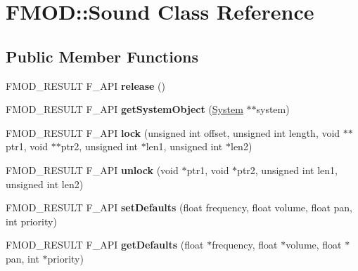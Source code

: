 \hypertarget{class_f_m_o_d_1_1_sound}{}\section{F\+M\+OD\+:\+:Sound Class Reference}
\label{class_f_m_o_d_1_1_sound}
\subsection*{Public Member Functions}
\begin{DoxyCompactItemize}
\item 
F\+M\+O\+D\+\_\+\+R\+E\+S\+U\+LT F\+\_\+\+A\+PI {\bfseries release} ()\hypertarget{class_f_m_o_d_1_1_sound_ab0d8425b6f8ad26b4011dc36fee9948c}{}\label{class_f_m_o_d_1_1_sound_ab0d8425b6f8ad26b4011dc36fee9948c}

\item 
F\+M\+O\+D\+\_\+\+R\+E\+S\+U\+LT F\+\_\+\+A\+PI {\bfseries get\+System\+Object} (\hyperlink{class_f_m_o_d_1_1_system}{System} $\ast$$\ast$system)\hypertarget{class_f_m_o_d_1_1_sound_aed24d7342fc12299472454730828987e}{}\label{class_f_m_o_d_1_1_sound_aed24d7342fc12299472454730828987e}

\item 
F\+M\+O\+D\+\_\+\+R\+E\+S\+U\+LT F\+\_\+\+A\+PI {\bfseries lock} (unsigned int offset, unsigned int length, void $\ast$$\ast$ptr1, void $\ast$$\ast$ptr2, unsigned int $\ast$len1, unsigned int $\ast$len2)\hypertarget{class_f_m_o_d_1_1_sound_a0f83fccead6df86323a21a0ae0207c61}{}\label{class_f_m_o_d_1_1_sound_a0f83fccead6df86323a21a0ae0207c61}

\item 
F\+M\+O\+D\+\_\+\+R\+E\+S\+U\+LT F\+\_\+\+A\+PI {\bfseries unlock} (void $\ast$ptr1, void $\ast$ptr2, unsigned int len1, unsigned int len2)\hypertarget{class_f_m_o_d_1_1_sound_ab80dbd8fdc67d3b4c0358de311865da3}{}\label{class_f_m_o_d_1_1_sound_ab80dbd8fdc67d3b4c0358de311865da3}

\item 
F\+M\+O\+D\+\_\+\+R\+E\+S\+U\+LT F\+\_\+\+A\+PI {\bfseries set\+Defaults} (float frequency, float volume, float pan, int priority)\hypertarget{class_f_m_o_d_1_1_sound_a287c29ce3062fd49c77732dc71353a5e}{}\label{class_f_m_o_d_1_1_sound_a287c29ce3062fd49c77732dc71353a5e}

\item 
F\+M\+O\+D\+\_\+\+R\+E\+S\+U\+LT F\+\_\+\+A\+PI {\bfseries get\+Defaults} (float $\ast$frequency, float $\ast$volume, float $\ast$pan, int $\ast$priority)\hypertarget{class_f_m_o_d_1_1_sound_a252e31cdc8bc20be31ce553c54aff2f4}{}\label{class_f_m_o_d_1_1_sound_a252e31cdc8bc20be31ce553c54aff2f4}


\end{DoxyCompactItemize}
